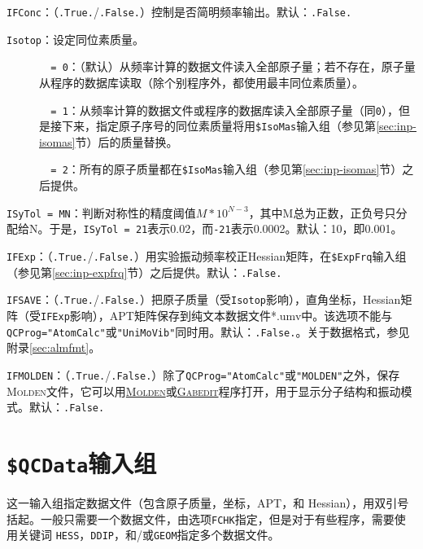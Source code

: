 \documentclass[12pt,a4paper,openany,twoside,cap]{ctexbook}
\begin{document}
\bigskip{}\bigskip{}
\verb|IFConc|：（\verb|.True.|/\verb|.False.|）控制是否简明频率输出。默认：\verb|.False.|

\bigskip{}\bigskip{}
\verb|Isotop|：设定同位素质量。
\begin{description}
\item[ ]\verb|  = 0|：（默认）从频率计算的数据文件读入全部原子量；若不存在，原子量从程序的数据库读取（除个别程序外，都使用最丰同位素质量）。
\item[ ]\verb|  = 1|：从频率计算的数据文件或程序的数据库读入全部原子量（同\verb|0|），但是接下来，指定原子序号的同位素质量将用\verb|$IsoMas|输入组（参见第\ref{sec:inp-isomas}节）后的质量替换。
\item[ ]\verb|  = 2|：所有的原子质量都在\verb|$IsoMas|输入组（参见第\ref{sec:inp-isomas}节）之后提供。
\end{description}

\bigskip{}\bigskip{}
\verb|ISyTol = MN|：判断对称性的精度阈值$M*10^{N-3}$，其中M总为正数，正负号只分配给N。于是，\verb|ISyTol = 21|表示0.02，而\verb|-21|表示0.0002。默认：10，即0.001。

\bigskip{}\bigskip{}
\verb|IFExp|：（\verb|.True.|/\verb|.False.|）用实验振动频率校正Hessian矩阵，在\verb|$ExpFrq|输入组（参见第\ref{sec:inp-expfrq}节）之后提供。默认：\verb|.False.|

\bigskip{}\bigskip{}
\verb|IFSAVE|：（\verb|.True.|/\verb|.False.|）把原子质量（受\verb|Isotop|影响），直角坐标，Hessian矩阵（受\verb|IFExp|影响），APT矩阵保存到纯文本数据文件*.umv中。该选项不能与\verb|QCProg="AtomCalc"|或\verb|"UniMoVib"|同时用。默认：\verb|.False.|。关于数据格式，参见附录\ref{sec:almfmt}。

\bigskip{}\bigskip{}
\verb|IFMOLDEN|：（\verb|.True.|/\verb|.False.|）除了\verb|QCProg="AtomCalc"|或\verb|"MOLDEN"|之外，保存\textsc{Molden}文件，它可以用\href{http://www.cmbi.ru.nl/molden/molden.html}{\textsc{Molden}}或\href{http://gabedit.sourceforge.net/}{\textsc{Gabedit}}程序打开，用于显示分子结构和振动模式。默认：\verb|.False.|


\section{\texttt{\$QCData}输入组} \label{sec:inp-qcdata}

这一输入组指定数据文件（包含原子质量，坐标，APT，和 Hessian），用双引号括起。一般只需要一个数据文件，由选项\verb|FCHK|指定，但是对于有些程序，需要使用关键词
\verb|HESS|，\verb|DDIP|，和/或\verb|GEOM|指定多个数据文件。
\end{document}
